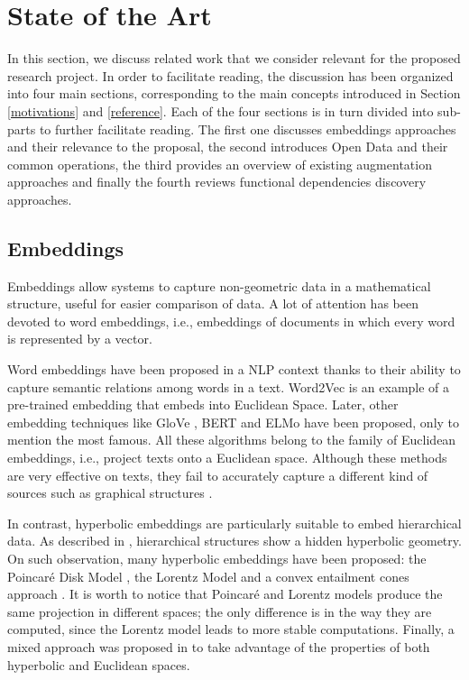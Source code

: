 \section{State of the Art}\label{related}
In this section, we discuss related work that we consider relevant for the proposed research project. In order to facilitate reading, the discussion has been organized into four main sections, corresponding to the main concepts introduced in Section \ref{motivations} and \ref{reference}. Each of the four sections is in turn divided into sub-parts to further facilitate reading. The first one discusses embeddings approaches and their relevance to the proposal, the second introduces Open Data and their common operations, the third provides an overview of existing augmentation approaches and finally the fourth reviews functional dependencies discovery approaches.

\subsection{Embeddings}
Embeddings allow systems to capture non-geometric data in a mathematical structure, useful for easier comparison of data. A lot of attention has been devoted to word embeddings, i.e., embeddings of documents in which every word is represented by a vector. 

Word embeddings have been proposed in a NLP context thanks to their ability to capture semantic relations among words in a text. 
Word2Vec \cite{Mikolov2013EfficientEO} is an example of a pre-trained embedding that embeds into Euclidean Space. 
Later, other embedding techniques like GloVe \cite{pennington2014glove}, BERT \cite{devlin2018bert} and ELMo \cite{peters2018deep} have been proposed, only to mention the most famous. 
All these algorithms belong to the family of Euclidean embeddings, i.e., project texts onto a Euclidean space. 
Although these methods are very effective on texts, they fail to accurately capture a different kind of sources such as graphical structures \cite{NIPS2017_7213}. 

In contrast, hyperbolic embeddings are particularly suitable to embed hierarchical data. 
As described in \cite{krioukov2010hyperbolic}, hierarchical structures show a hidden hyperbolic geometry. 
On such observation, many hyperbolic embeddings have been proposed: the Poincar\'e Disk Model \cite{NIPS2017_7213}, the Lorentz Model \cite{DBLP:journals/corr/abs-1806-03417} and a convex entailment cones approach \cite{ganea2018hyperbolic}. 
It is worth to notice that Poincar\'e and Lorentz models produce the same projection in different spaces; the only difference is in the way they are computed, since the Lorentz model leads to more stable computations. 
Finally, a mixed approach was proposed in \cite{gu2018learning} to take advantage of the properties of both hyperbolic and Euclidean spaces. 

